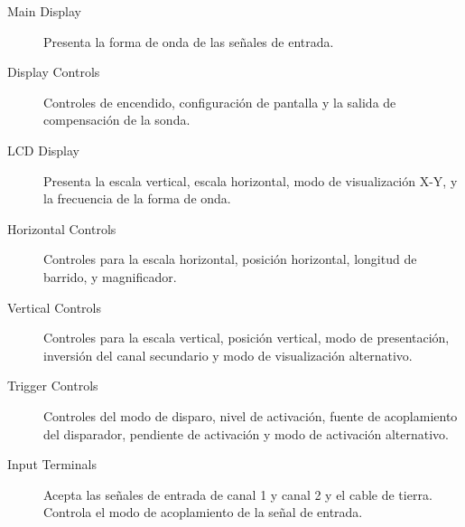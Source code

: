 \documentclass[letter,twoside,11pt]{article}
\begin{document}
\begin{description}
    \item [Main Display] Presenta la forma de onda de las señales de entrada.
    \item [Display Controls] Controles de encendido, configuración de pantalla
    y la salida de compensación de la sonda.
    \item [LCD Display] Presenta la escala vertical, escala horizontal, modo de
    visualización X-Y, y la frecuencia de la forma de onda.
    \item [Horizontal Controls] Controles para la escala horizontal, posición
    horizontal, longitud de barrido, y magnificador.
    \item [Vertical Controls] Controles para la escala vertical, posición
    vertical, modo de presentación, inversión del canal secundario y modo de
    visualización alternativo.
    \item [Trigger Controls] Controles del modo de disparo, nivel de activación,
    fuente de acoplamiento del disparador, pendiente de activación y modo de
    activación alternativo.
    \item [Input Terminals] Acepta las señales de entrada de canal 1 y canal 2
    y el cable de tierra. Controla el modo de acoplamiento de la señal de
    entrada.
\end{description}
\end{document}
